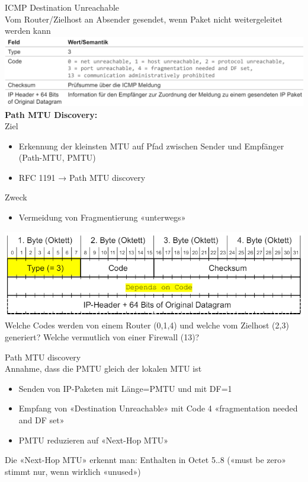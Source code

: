 \begin{definition}{ICMP Destination Unreachable}\\
    Vom Router/Zielhost an Absender gesendet, wenn Paket nicht weitergeleitet werden kann\\
        \includegraphics[width=1\linewidth]{images/destination_unreachable.png}\\
    \textbf{Path MTU Discovery:}\\
    Ziel
    \begin{itemize}
        \item Erkennung der kleinsten MTU auf Pfad zwischen Sender und Empfänger (Path-MTU, PMTU)
        \item RFC 1191 → Path MTU discovery
    \end{itemize}
    Zweck
    \begin{itemize}
        \item Vermeidung von Fragmentierung «unterwegs»
    \end{itemize}
\end{definition}

\begin{example}
        \includegraphics[width=0.75\linewidth]{images/dest_unreachable_ex1.png}\\
    Welche Codes werden von einem Router (0,1,4) und welche vom Zielhost (2,3) generiert?
    Welche vermutlich von einer Firewall (13)?
\end{example}

\begin{KR}{Path MTU discovery}\\
    Annahme, dass die PMTU gleich der lokalen MTU ist
    \begin{itemize}
        \item Senden von IP-Paketen mit Länge=PMTU und mit DF=1
        \item Empfang von «Destination Unreachable» mit Code 4 «fragmentation needed and DF set»
        \item PMTU reduzieren auf «Next-Hop MTU»
    \end{itemize}
    Die «Next-Hop MTU» erkennt man: Enthalten in Octet 5..8 («must be zero» stimmt nur, wenn wirklich «unused»)
\end{KR}

